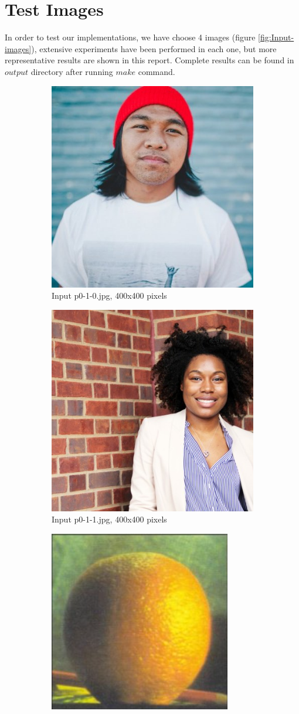 \section{Test Images}

In order to test our implementations, we have choose 4 images (figure \ref{fig:Input-images}), extensive experiments have been performed in each one, but more representative results are shown in this report. Complete results can be found in $output$ directory after running $make$ command.

\begin{figure}[h!]
\centering
\begin{subfigure}{0.5\textwidth}
  \centering
  \includegraphics[width=0.5\linewidth]{input/p1-1-0.jpg}
  \caption{Input p0-1-0.jpg, 400x400 pixels}
\end{subfigure}%
\begin{subfigure}{0.5\textwidth}
  \centering
  \includegraphics[width=0.5\linewidth]{input/p1-1-1.jpg}
  \caption{Input p0-1-1.jpg, 400x400 pixels}
\end{subfigure}
\begin{subfigure}{0.5\textwidth}
  \centering
  \includegraphics[width=0.5\linewidth]{input/p1-1-2.png}

\end{subfigure}
\end{figure}
